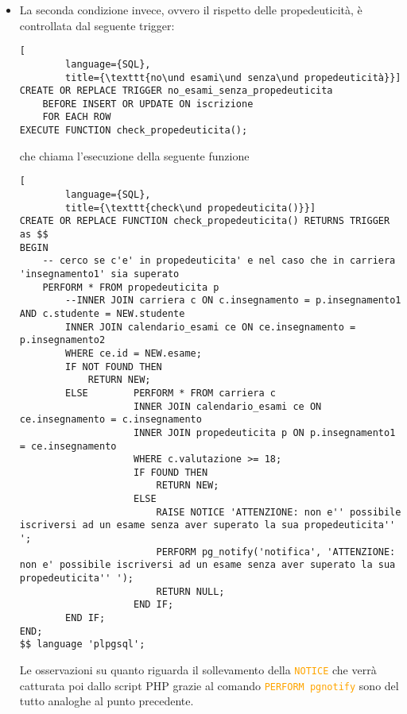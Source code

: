 \documentclass{article}
\newcommand{\sqlcommand}[1]{\texttt{\textcolor{orange}{#1}}}
\newcommand{\und}[0]{\textunderscore}
\begin{document}
\begin{itemize}
\begin{itemize}
        \item a livello di funzionalità, la funzione contiene anche i messaggi di informazione:
        \begin{itemize}
            \item la \sqlcommand{NOTICE} verrà mostrata come messaggio se la funzione viene chiamata da terminale
            \item il comando \sqlcommand{PERFORM pg\und notify} invece genererà una notifica che potrà essere catturata dal linguaggio di scripting PHP
        \end{itemize}
    \end{itemize}

    \item La seconda condizione invece, ovvero il rispetto delle propedeuticità, è controllata dal seguente trigger:
    \begin{lstlisting}[
        language={SQL},
        title={\texttt{no\und esami\und senza\und propedeuticità}}]
CREATE OR REPLACE TRIGGER no_esami_senza_propedeuticita
    BEFORE INSERT OR UPDATE ON iscrizione
    FOR EACH ROW
EXECUTE FUNCTION check_propedeuticita();
    \end{lstlisting}

    che chiama l'esecuzione della seguente funzione

    \begin{lstlisting}[
        language={SQL},
        title={\texttt{check\und propedeuticita()}}]
CREATE OR REPLACE FUNCTION check_propedeuticita() RETURNS TRIGGER as $$
BEGIN
    -- cerco se c'e' in propedeuticita' e nel caso che in carriera 'insegnamento1' sia superato
    PERFORM * FROM propedeuticita p
        --INNER JOIN carriera c ON c.insegnamento = p.insegnamento1 AND c.studente = NEW.studente
        INNER JOIN calendario_esami ce ON ce.insegnamento = p.insegnamento2
        WHERE ce.id = NEW.esame;
        IF NOT FOUND THEN
            RETURN NEW;
        ELSE        PERFORM * FROM carriera c
                    INNER JOIN calendario_esami ce ON ce.insegnamento = c.insegnamento
                    INNER JOIN propedeuticita p ON p.insegnamento1 = ce.insegnamento
                    WHERE c.valutazione >= 18;
                    IF FOUND THEN
                        RETURN NEW;
                    ELSE
                        RAISE NOTICE 'ATTENZIONE: non e'' possibile iscriversi ad un esame senza aver superato la sua propedeuticita'' ';
                        PERFORM pg_notify('notifica', 'ATTENZIONE: non e' possibile iscriversi ad un esame senza aver superato la sua propedeuticita'' ');
                        RETURN NULL;
                    END IF;
        END IF;
END;
$$ language 'plpgsql';
    \end{lstlisting}
    Le osservazioni su quanto riguarda il sollevamento della \sqlcommand{NOTICE} che verrà catturata poi dallo script PHP grazie al comando \sqlcommand{PERFORM pg\und notify} sono del tutto analoghe al punto precedente.
\end{itemize}
\end{document}

